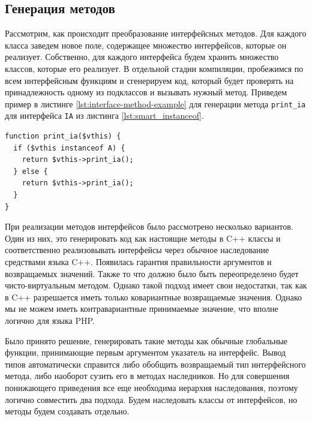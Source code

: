 \subsection{Генерация методов}
Рассмотрим, как происходит преобразование интерфейсных методов.
Для каждого класса заведем новое поле, содержащее множество интерфейсов, которые он реализует.
Собственно, для каждого интерфейса будем хранить множество классов, которые его реализует.
В отдельной стадии компиляции, пробежимся по всем интерфейсным функциям и сгенерируем код, который будет проверять на принадлежность одному из подклассов и вызывать нужный метод.
Приведем пример в листинге \ref{lst:interface-method-example} для генерации метода \verb|print_ia| для интерфейса \verb|IA| из листинга \ref{lst:smart_instanceof}.
\begin{lstlisting}[caption={Пример генерации интерфейсного метода},label={lst:interface-method-example}]
function print_ia($vthis) {
  if ($vthis instanceof A) {
    return $vthis->print_ia();
  } else {
    return $vthis->print_ia();
  }
}
\end{lstlisting}

При реализации методов интерфейсов было рассмотрено несколько вариантов.
Один из них, это генерировать код как настоящие методы в C++ классы и соответственно реализовывать интерфейсы через обычное наследование средствами языка C++.
Появилась гарантия правильности аргументов и возвращаемых значений.
Также то что должно было быть переопределено будет чисто-виртуальным методом.
Однако такой подход имеет свои недостатки, так как в C++ разрешается иметь только ковариантные возвращаемые значения.
Однако мы не можем иметь контравариантные принимаемые значение, что вполне логично для языка PHP.

Было принято решение, генерировать такие методы как обычные глобальные функции, принимающие первым аргументом указатель на интерфейс.
Вывод типов автоматически справится либо обобщить возвращаемый тип интерфейсного метода, либо наоборот сузить его в методах наследников.
Но для совершения понижающего приведения все еще необходима иерархия наследования, поэтому логично совместить два подхода.
Будем наследовать классы от интерфейсов, но методы будем создавать отдельно.

